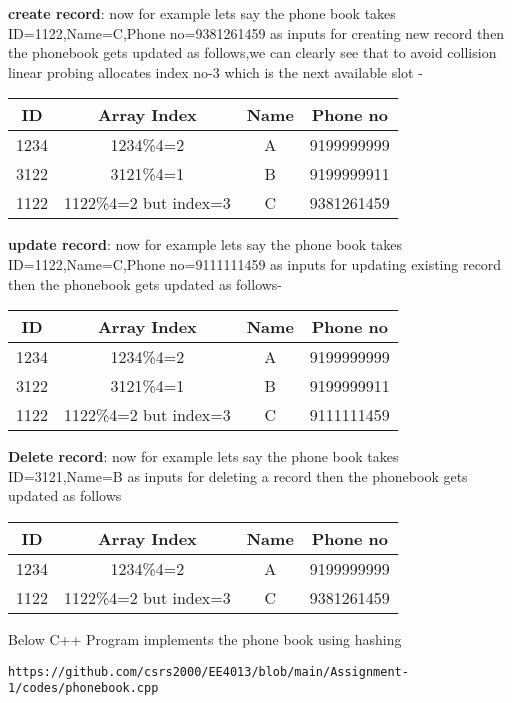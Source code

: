 \documentclass[journal,12pt,twocolumn]{IEEEtran}
\begin{document}
\textbf{create record}: now for example lets say the phone book takes ID=1122,Name=C,Phone no=9381261459 as inputs for creating new record then the phonebook gets updated as follows,we can clearly see that to avoid collision linear probing allocates index no-3 which is the next available slot  -
\begin{center}
\begin{tabular}{ |c|c|c|c| } 
 \hline
ID&Array Index&Name&Phone no\\
\hline 
1234&1234\%4=2&A&9199999999\\
3122&3121\%4=1&B&9199999911\\
1122&1122\%4=2 but index=3&C&9381261459\\
 \hline
\end{tabular}
\end{center}
\textbf{update  record}: now for example lets say the phone book takes ID=1122,Name=C,Phone no=9111111459 as inputs for updating existing record then the phonebook gets updated as follows-
\begin{center}
\begin{tabular}{ |c|c|c|c| } 
 \hline
ID&Array Index&Name&Phone no\\
\hline 
1234&1234\%4=2&A&9199999999\\
3122&3121\%4=1&B&9199999911\\
1122&1122\%4=2 but index=3&C&9111111459\\
 \hline
\end{tabular}
\end{center}
\textbf{Delete record}: now for example lets say the phone book takes ID=3121,Name=B as inputs for deleting a record then the phonebook gets updated as follows
\begin{center}
\begin{tabular}{ |c|c|c|c| } 
 \hline
ID&Array Index&Name&Phone no\\
\hline 
1234&1234\%4=2&A&9199999999\\
1122&1122\%4=2 but index=3&C&9381261459\\
 \hline
\end{tabular}
\end{center}


Below C++ Program implements the  phone book using hashing
\begin{lstlisting}
https://github.com/csrs2000/EE4013/blob/main/Assignment-1/codes/phonebook.cpp
\end{lstlisting}
\pagebreak
\end{document}

